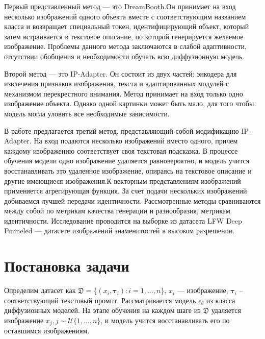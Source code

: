 \documentclass{article}
\begin{document}
Первый представленный метод --- это DreamBooth\cite{ruiz2022dreambooth}.Он принимает на вход несколько изображений одного объекта вместе с соответствующим названием класса и возвращает специальный токен, идентифицирующий объект, который затем встраивается в текстовое описание, по которой генерируется желаемое изображение. Проблемы данного метода заключаются в слабой адаптивности, отсутствии обобщения и необходимости обучать всю диффузионную модель. 

Второй метод --- это IP-Adapter\cite{ye2023ip-adapter}. Он состоит из двух частей: энкодера для извлечения признаков изображения, текста и адаптированных модулей с механизмом перекрестного внимания\cite{DBLP:journals/corr/VaswaniSPUJGKP17}. Метод принимает на вход только одно изображение объекта. Однако одной картинки может быть мало, для того чтобы модель могла уловить все необходимые зависимости. 

В работе предлагается третий метод, представляющий собой модификацию IP-Adapter. На вход подаются несколько изображений вместо одного, причем каждому изображению соответствует своя текстовая подсказка. В процессе обучения модели одно изображение удаляется равновероятно, и модель учится восстанавливать это удаленное изображение, опираясь на текстовое описание и другие имеющиеся изображения.К векторным представлениям изображений применяется агрегирующая функция. За счет подачи нескольких изображений добиваемся лучшей передачи идентичности. 
Рассмотренные методы сравниваются между собой по метрикам качества генерации и разнообразия, метрикам идентичности.
Исследование проводится на выборке из датасета LFW Deep Funneled\cite{LFWTech} --- датасете изображений знаменитостей в высоком разрешении. 

\section{Постановка задачи}

Определим датасет как $ \mathfrak{D}=\{ ({x}_{i}, \mathbf{\tau}_{i}): i = 1, \dots, n\}$, ${x}_{i}$ --- изображение, $\mathbf{\tau}_{i}$ -- соответствующий текстовый промпт. Рассматривается модель $\epsilon_{\theta}$ из класса диффузионных моделей. На этапе обучения на каждом шаге из $\mathfrak{D}$ удаляется изображение ${x}_{j}, j \sim \mathcal{U}\{1, \dots, n\}$, и модель учится восстанавливать его по оставшимся изображениям.
\end{document}
